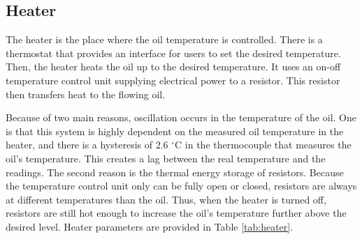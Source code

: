 \subsection{Heater}
The heater is the place where the oil temperature is controlled. There is a thermostat that provides an interface for users to set the desired temperature. Then, the heater heats the oil up to the desired temperature. It uses an on-off temperature control unit supplying electrical power to a resistor. This resistor then transfers heat to the flowing oil.
\par
Because of two main reasons, oscillation occurs in the temperature of the oil. One is that this system is highly dependent on the measured oil temperature in the heater, and there is a hysteresis of 2.6  $^\circ$C in the thermocouple that measures the oil's temperature. This creates a lag between the real temperature and the readings. The second reason is the thermal energy storage of resistors. Because the temperature control unit only can be fully open or closed, resistors are always at different temperatures than the oil. Thus, when the heater is turned off, resistors are still hot enough to increase the oil's temperature further above the desired level. Heater parameters are provided in Table \ref{tab:heater}.

